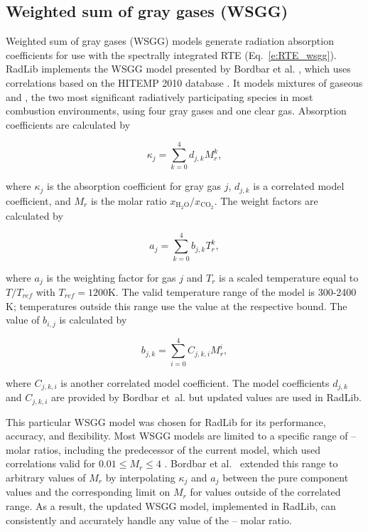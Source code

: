 \documentclass[preprint,12pt]{elsarticle}
\begin{document}

\subsection{Weighted sum of gray gases (WSGG)} \label{s:wsgg}

Weighted sum of gray gases (WSGG) models generate radiation absorption coefficients for use with the spectrally integrated RTE (Eq.~\ref{e:RTE_wsgg}).
RadLib implements the WSGG model presented by Bordbar et al. \citep{Bordbar_2014,Bordbar_2020}, which uses correlations based on the HITEMP 2010 database \cite{Rothman_2010}. It models mixtures of gaseous  and , the two most significant radiatively participating species in most combustion environments, using four gray gases and one clear gas. Absorption coefficients are calculated by 
%
\begin{linenomath}
\begin{equation}
    \kappa_j=\sum_{k=0}^{4}d_{j,k}M_r^k,
\end{equation}
\end{linenomath}
%
where $\kappa_j$ is the absorption coefficient for gray gas $j$, $d_{j,k}$ is a correlated model coefficient, and $M_r$ is the molar ratio $x_{\mathrm{H_2O}}/x_{\mathrm{CO_2}}$. The weight factors are calculated by 
%
\begin{linenomath}
\begin{equation}
    a_j=\sum_{k=0}^{4}b_{j,k}T_r^k,
\end{equation}
\end{linenomath}
%
where $a_j$ is the weighting factor for gas $j$ and $T_r$ is a scaled temperature equal to $T/T_{ref}$ with $T_{ref}=1200$K. The valid temperature range of the model is 300-2400 K; temperatures outside this range use the value at the respective bound. The value of $b_{i,j}$ is calculated by 
%
\begin{linenomath}
\begin{equation}
 b_{j,k}=\sum_{i=0}^{4}C_{j,k,i}M_r^i,
\end{equation}
\end{linenomath}
%
where $C_{j,k,i}$ is another correlated model coefficient. The model coefficients $d_{j,k}$ and $C_{j,k,i}$ are provided by Bordbar et~al. \citep{Bordbar_2014,Bordbar_2020} but updated values are used in RadLib. 

This particular WSGG model was chosen for RadLib for its performance, accuracy, and flexibility. Most WSGG models are limited to a specific range of -- molar ratios, including the predecessor of the current model, which used correlations valid for $0.01\le M_r\le4$ \citep{Bordbar_2014}. Bordbar et al.~\citep{Bordbar_2020} extended this range to arbitrary values of $M_r$ by interpolating $\kappa_j$ and $a_j$ between the pure component values and the corresponding limit on $M_r$ for values outside of the correlated range. As a result, the updated WSGG model, implemented in RadLib, can consistently and accurately handle any value of the -- molar ratio. 
\end{document}
